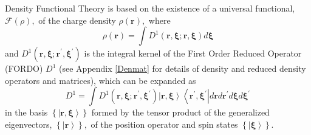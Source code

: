 \documentclass[aps,preprint]{revtex4}%
\begin{document}
Density Functional Theory is based on the existence of a universal functional,
$\mathcal{F}\left(  \rho\right)  ,$ of the charge density $\rho\left(
\boldsymbol{r}\right)  ,$ where
\begin{equation}
\rho\left(  \boldsymbol{r}\right)  =\int D^{1}\left(  \boldsymbol{r,\xi;r,\xi
}\right)  d\boldsymbol{\xi}%
\end{equation}
and $D^{1}\left(  \boldsymbol{r,\xi;r}^{\prime}\boldsymbol{,\xi}^{\prime
}\right)  $ is the integral kernel of the First Order Reduced Operator (FORDO)
$D^{1}$ (see Appendix \ref{Denmat} for details of density and reduced density
operators and matrices), which can be expanded as
\begin{equation}
D^{1}=\int D^{1}\left(  \boldsymbol{r,\xi;r}^{\prime}\boldsymbol{,\xi}%
^{\prime}\right)  \left\vert \boldsymbol{r,\xi}\right\rangle \left\langle
\boldsymbol{r}^{\prime}\boldsymbol{,\xi}^{\prime}\right\vert d\boldsymbol{r}%
d\boldsymbol{r}^{\prime}d\boldsymbol{\xi}d\boldsymbol{\xi}^{\prime}%
\end{equation}
in the basis $\left\{  \left\vert \boldsymbol{r,\xi}\right\rangle \right\}  $
formed by the tensor product of the generalized eigenvectors, $\left\{
\left\vert \boldsymbol{r}\right\rangle \right\}  ,$ of the position operator
and spin states $\left\{  \left\vert \boldsymbol{\xi}\right\rangle \right\}  $.
\end{document}
